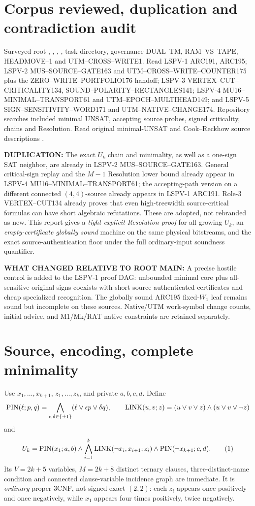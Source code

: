 \documentclass[11pt]{article}
\begin{document}
\section{Corpus reviewed, duplication and contradiction audit}
Surveyed root , , , , task directory, governance DUAL--TM, RAM--VS--TAPE, HEADMOVE--1 and UTM--CROSS--WRITE1. Read LSPV-1 ARC191, ARC195; LSPV-2 MUS--SOURCE--GATE163 and UTM--CROSS--WRITE--COUNTER175 plus the ZERO--WRITE--PORTFOLIO176 handoff; LSPV-3 VERTEX--CUT--CRITICALITY134, SOUND--POLARITY--RECTANGLES141; LSPV-4 MU16--MINIMAL--TRANSPORT61 and UTM--EPOCH--MULTIHEAD149; and LSPV-5 SIGN--SENSITIVITY--WORD171 and UTM--NATIVE--CHANGE174. Repository searches included minimal UNSAT, accepting source probes, signed criticality, chains and Resolution. Read original minimal-UNSAT and Cook--Reckhow source descriptions \cite{lee,cook}.

\textbf{DUPLICATION:} The exact \(U_k\) chain and minimality, as well as a one-sign SAT neighbor, are already in LSPV-2 MUS--SOURCE--GATE163. General critical-sign replay and the \(M-1\) Resolution lower bound already appear in LSPV-4 MU16--MINIMAL--TRANSPORT61; the accepting-path version on a different connected \((4,4)\)-source already appears in LSPV-1 ARC191. Role-3 VERTEX--CUT134 already proves that even high-treewidth source-critical formulas can have short algebraic refutations. These are adopted, not rebranded as new. This report gives a \emph{tight explicit Resolution proof} for all growing \(U_k\), an \emph{empty-certificate globally sound} machine on the same physical bitstreams, and the exact source-authentication floor under the full ordinary-input soundness quantifier.

\textbf{WHAT CHANGED RELATIVE TO ROOT MAIN:} A precise hostile control is added to the LSPV-1 proof DAG: unbounded minimal core plus all-sensitive original signs coexists with short source-authenticated certificates and cheap specialized recognition. The globally sound ARC195 fixed-\(W_1\) leaf remains sound but incomplete on these sources. Native/UTM work-symbol change counts, initial advice, and M1/Mk/RAT native constraints are retained separately.
\section{Source, encoding, complete minimality}
Use \(x_1,\ldots,x_{k+1}\), \(z_1,\ldots,z_k\), and private \(a,b,c,d\). Define
\[
 {\rm PIN}(\ell;p,q)=\bigwedge_{\epsilon,\delta\in\{\pm1\}}
 (\ell\vee\epsilon p\vee\delta q),\qquad
 {\rm LINK}(u,v;z)=(u\vee v\vee z)\wedge(u\vee v\vee\neg z)
\]
and
\[
U_k={\rm PIN}(x_1;a,b)\wedge
\bigwedge_{i=1}^k{\rm LINK}(\neg x_i,x_{i+1};z_i)
\wedge{\rm PIN}(\neg x_{k+1};c,d). \tag{1}
\]
Its \(V=2k+5\) variables, \(M=2k+8\) distinct ternary clauses, three-distinct-name condition and connected clause-variable incidence graph are immediate. It is \emph{ordinary} proper 3CNF, not signed exact-\((2,2)\): each \(z_i\) appears once positively and once negatively, while \(x_1\) appears four times positively, twice negatively.
\end{document}
